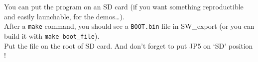 You can put the program on an SD card (if you want something
reproductible and easily launchable, for the demos\ldots).\\
After a \texttt{make} command, you should see a \texttt{BOOT.bin} file
in SW\_export (or you can build it with \texttt{make\ boot\_file}).\\
Put the file on the root of SD card. And don't forget to put JP5 on `SD'
position !







